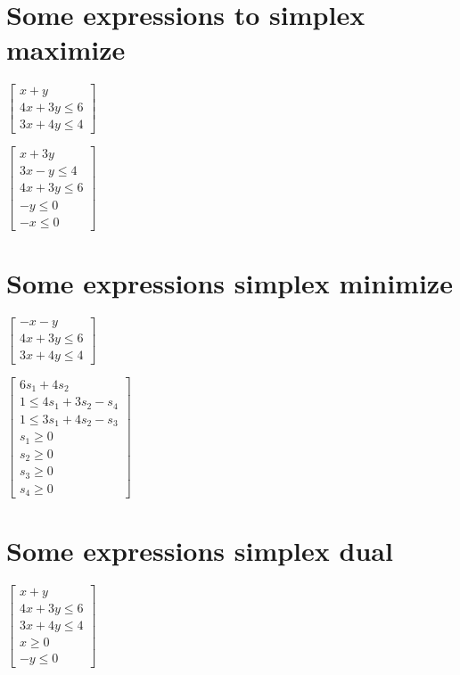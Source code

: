 \documentclass{article}
\begin{document}
\section{Some expressions to simplex maximize}

$\left[ 
\begin{array}{c}
x+y \\ 
4x+3y\leq 6 \\ 
3x+4y\leq 4%
\end{array}%
\right] $

$\left[ 
\begin{array}{r}
x+3y \\ 
3x-y\leq 4 \\ 
4x+3y\leq 6 \\ 
-y\leq 0 \\ 
-x\leq 0%
\end{array}%
\right] $

\section{Some expressions simplex minimize}

$\left[ 
\begin{array}{c}
-x-y \\ 
4x+3y\leq 6 \\ 
3x+4y\leq 4%
\end{array}%
\right] $

$\left[ 
\begin{array}{l}
6s_{1}+4s_{2} \\ 
1\leq 4s_{1}+3s_{2}-s_{4} \\ 
1\leq 3s_{1}+4s_{2}-s_{3} \\ 
s_{1}\geq 0 \\ 
s_{2}\geq 0 \\ 
s_{3}\geq 0 \\ 
s_{4}\geq 0%
\end{array}%
\right] $

\section{Some expressions simplex dual}

$\left[ 
\begin{array}{r}
x+y \\ 
4x+3y\leq 6 \\ 
3x+4y\leq 4 \\ 
x\geq 0 \\ 
-y\leq 0%
\end{array}%
\right] $
\end{document}
